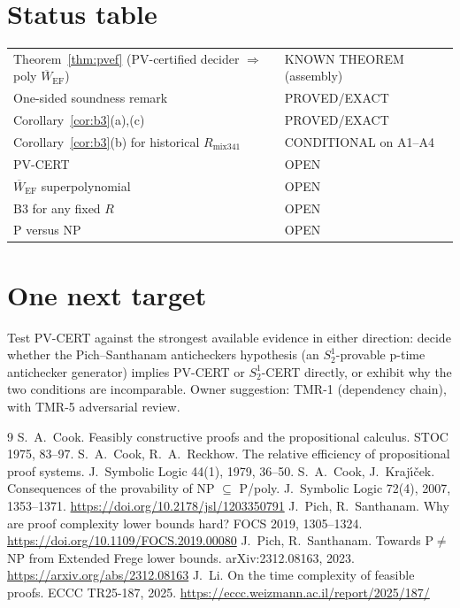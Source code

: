 \documentclass[11pt]{article}
\theoremstyle{remark}
\newcommand{\EF}{\mathrm{EF}}
\newcommand{\Wb}{\overline{W}}
\begin{document}
\section{Status table}
\begin{center}
\begin{tabular}{ll}
Theorem~\ref{thm:pvef} (PV-certified decider $\Rightarrow$ poly $\Wb_{\EF}$) & KNOWN THEOREM (assembly)\\
One-sided soundness remark & PROVED/EXACT\\
Corollary~\ref{cor:b3}(a),(c) & PROVED/EXACT\\
Corollary~\ref{cor:b3}(b) for historical $R_{\mathrm{mix341}}$ & CONDITIONAL on A1--A4\\
PV-CERT & OPEN\\
$\Wb_{\EF}$ superpolynomial & OPEN\\
B3 for any fixed $R$ & OPEN\\
P versus NP & OPEN
\end{tabular}
\end{center}

\section{One next target}
Test PV-CERT against the strongest available evidence in either direction: decide whether the
Pich--Santhanam anticheckers hypothesis (an $S^1_2$-provable p-time antichecker generator) implies
PV-CERT or $S^1_2$-CERT directly, or exhibit why the two conditions are incomparable. Owner suggestion:
TMR-1 (dependency chain), with TMR-5 adversarial review.

\begin{thebibliography}{9}
 S.~A.~Cook. Feasibly constructive proofs and the propositional calculus. STOC 1975, 83--97.
 S.~A.~Cook, R.~A.~Reckhow. The relative efficiency of propositional proof systems. J.~Symbolic Logic 44(1), 1979, 36--50.
 S.~A.~Cook, J.~Kraj\'{\i}\v{c}ek. Consequences of the provability of NP $\subseteq$ P/poly. J.~Symbolic Logic 72(4), 2007, 1353--1371. \url{https://doi.org/10.2178/jsl/1203350791}
 J.~Pich, R.~Santhanam. Why are proof complexity lower bounds hard? FOCS 2019, 1305--1324. \url{https://doi.org/10.1109/FOCS.2019.00080}
 J.~Pich, R.~Santhanam. Towards P$\neq$NP from Extended Frege lower bounds. arXiv:2312.08163, 2023. \url{https://arxiv.org/abs/2312.08163}
 J.~Li. On the time complexity of feasible proofs. ECCC TR25-187, 2025. \url{https://eccc.weizmann.ac.il/report/2025/187/}
\end{thebibliography}
\end{document}
